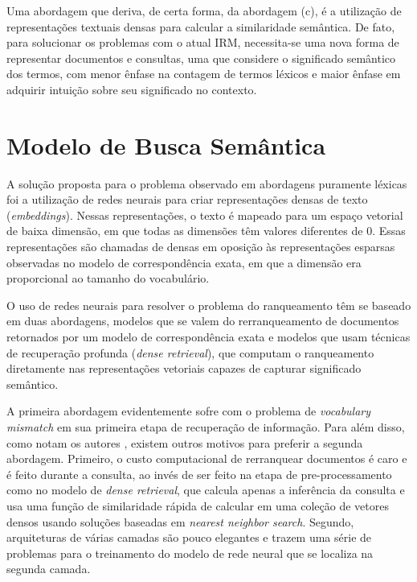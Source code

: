 \documentclass[
	12pt,				%
	openright,			%
	oneside,			%
	a4paper,			%
	english,			%
	french,				%
	spanish,			%
	brazil				%
	]{abntex2}
\begin{document}
Uma abordagem que deriva, de certa forma, da abordagem (c), é a utilização de representações textuais densas para calcular a similaridade semântica. \cite{}
De fato, para solucionar os problemas com o atual IRM, necessita-se uma nova forma de representar documentos e consultas, uma que considere o significado semântico dos termos, com menor ênfase na contagem de termos léxicos e maior ênfase em adquirir intuição sobre seu significado no contexto. \cite{bhaskar-craswell-2018}


\section{Modelo de Busca Semântica}\label{sec:modelo-de-busca-semantica}

A solução proposta para o problema observado em abordagens puramente léxicas foi a utilização de redes neurais para criar representações densas de texto (\textit{embeddings}).
Nessas representações, o texto é mapeado para um espaço vetorial de baixa dimensão, em que todas as dimensões têm valores diferentes de 0.
Essas representações são chamadas de densas em oposição às representações esparsas observadas no modelo de correspondência exata, em que a dimensão era proporcional ao tamanho do vocabulário.

O uso de redes neurais para resolver o problema do ranqueamento têm se baseado em duas abordagens, modelos que se valem do rerranqueamento de documentos retornados por um modelo de correspondência exata e modelos que usam técnicas de recuperação profunda (\textit{dense retrieval}), que computam o ranqueamento diretamente nas representações vetoriais capazes de capturar significado semântico. \cite{}

A primeira abordagem evidentemente sofre com o problema de \textit{vocabulary mismatch} em sua primeira etapa de recuperação de informação. Para além disso, como notam os autores \citeauthor{}, existem outros motivos para preferir a segunda abordagem. Primeiro, o custo computacional de rerranquear documentos é caro e é feito durante a consulta, ao invés de ser feito na etapa de pre-processamento como no modelo de \textit{dense retrieval}, que calcula apenas a inferência da consulta e usa uma função de similaridade rápida de calcular em uma coleção de vetores densos usando soluções baseadas em \textit{nearest neighbor search}. Segundo, arquiteturas de várias camadas são pouco elegantes e trazem uma série de problemas para o treinamento do modelo de rede neural que se localiza na segunda camada.
\end{document}
